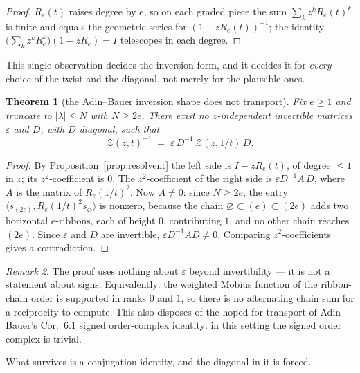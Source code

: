 \documentclass[11pt]{article}
\newtheorem{theorem}{Theorem}[section]
\theoremstyle{definition}
\theoremstyle{remark}
\newtheorem{remark}[theorem]{Remark}
\newcommand{\Zc}{\mathcal{Z}}
\begin{document}
\begin{proof}
$R_e(t)$ raises degree by $e$, so on each graded piece the sum $\sum_kz^kR_e(t)^k$ is finite
and equals the geometric series for $(1-zR_e(t))^{-1}$; the identity
$\bigl(\sum_kz^kR_e^k\bigr)(1-zR_e)=I$ telescopes in each degree.
\end{proof}

This single observation decides the inversion form, and it decides it for \emph{every}
choice of the twist and the diagonal, not merely for the plausible ones.

\begin{theorem}[the Adin--Bauer inversion shape does not transport]\label{thm:noinv}
Fix $e\ge1$ and truncate to $|\lambda|\le N$ with $N\ge2e$.  There exist \emph{no}
$z$-independent invertible matrices $\varepsilon$ and $D$, with $D$ diagonal, such that
\[
  \Zc(z,t)^{-1}\;=\;\varepsilon\,D^{-1}\,\Zc(z,1/t)\,D .
\]
\end{theorem}

\begin{proof}
By Proposition~\ref{prop:resolvent} the left side is $I-zR_e(t)$, of degree $\le1$ in $z$;
its $z^2$-coefficient is $0$.  The $z^2$-coefficient of the right side is
$\varepsilon D^{-1}A\,D$, where $A$ is the matrix of $R_e(1/t)^2$.  Now $A\ne0$: since
$N\ge2e$, the entry $\langle s_{(2e)},R_e(1/t)^2s_\varnothing\rangle$ is nonzero, because the
chain $\varnothing\subset(e)\subset(2e)$ adds two horizontal $e$-ribbons, each of height $0$,
contributing $1$, and no other chain reaches $(2e)$.  Since $\varepsilon$ and $D$ are
invertible, $\varepsilon D^{-1}AD\ne0$.  Comparing $z^2$-coefficients gives a contradiction.
\end{proof}

\begin{remark}
The proof uses nothing about $\varepsilon$ beyond invertibility --- it is not a statement
about signs.  Equivalently: the weighted M\"obius function of the ribbon-chain order is
supported in ranks $0$ and $1$, so there is no alternating chain sum for a reciprocity to
compute.  This also disposes of the hoped-for transport of Adin--Bauer's Cor.~6.1 signed
order-complex identity: in this setting the signed order complex is trivial.
\end{remark}

What survives is a conjugation identity, and the diagonal in it is forced.
\end{document}
